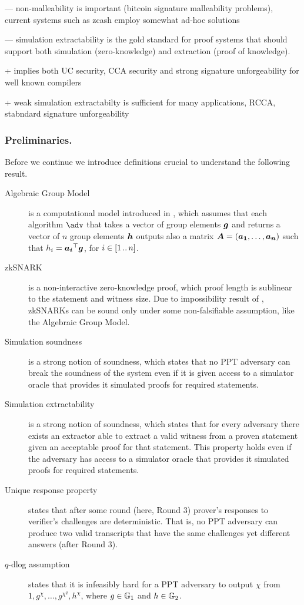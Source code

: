\documentclass[runningheads,11pt]{llncs}
\let\spvec\vec
\let\vec\accentvec
\let\vec\spvec
\def\vec#1{\mathchoice{\mbox{\boldmath$\displaystyle#1$}}
	{\mbox{\boldmath$\textstyle#1$}}
	{\mbox{\boldmath$\scriptstyle#1$}}
	{\mbox{\boldmath$\scriptscriptstyle#1$}}}
\begin{document}
  --- non-malleability is important (bitcoin signature malleability problems), current
  systems such as zcash employ somewhat ad-hoc solutions

  --- simulation extractability is the gold standard for proof systems that
  should support both simulation (zero-knowledge) and extraction (proof of
  knowledge).

  + implies both UC security, CCA security and strong signature unforgeability
  for well known compilers

  + weak simulation extractabilty is sufficient for many applications, RCCA,
  stabndard signature unforgeability
	
		
	\subsubsection*{Preliminaries.}
	Before we continue we introduce definitions crucial to understand the following result. 
	\begin{description}
		\item[Algebraic Group Model] is a computational model introduced in \cite{C:FucKilLos18}, which assumes that each algorithm $\adv$ that takes a vector of group elements $\vec{g}$ and returns a vector of $n$ group elements $\vec{h}$ outputs also a matrix $\vec{A} = (\vec{a_1}, \ldots, \vec{a_n})$ such that $h_i = \vec{a_i}^\top \vec{g}$, for $i \in [1 \, .. \, n]$.
		\item[zkSNARK] is a non-interactive zero-knowledge proof, which proof length is sublinear to the statement and witness size. Due to impossibility result of \cite{STOC:GenWic11}, zkSNARKs can be sound only under some non-falsifiable assumption, like the Algebraic Group Model.
		\item[Simulation soundness] is a strong notion of soundness, which states that no PPT adversary can break the soundness of the system even if it is given access to a simulator oracle that provides it simulated proofs for required statements.
		\item[Simulation extractability] is a strong notion of soundness, which states that for every adversary there exists an extractor able to extract a valid witness from a proven statement given an acceptable proof for that statement. This property holds even if the adversary has access to a simulator oracle that provides it simulated proofs for required statements. 
		\item[Unique response property] states that after some round (here, Round 3) prover's responses to verifier's challenges are deterministic. That is, no PPT adversary can produce two valid transcripts that have the same challenges yet different answers (after Round 3).
		\item[$q$-dlog assumption] states that it is infeasibly hard for a PPT adversary to output $\chi$ from $1, g^{\chi}, \ldots, g^{\chi^q}, h^{\chi}$, where $g \in \mathbb{G}_1$ and $h \in \mathbb{G}_2$.
	\end{description}
	
\end{document}

